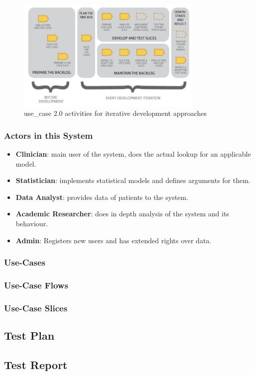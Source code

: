 {\begin{figure}[!ht]
\centering
\includegraphics[width=0.8\textwidth]{figures/uc20_flow}
\caption{\gls{use_case} 2.0 activities for iterative development approaches}
\label{fig:usecase20:flow}
\end{figure}


\subsubsection{Actors in this System}
\label{sub:sassoon:actors}
\begin{itemize}
	\item \textbf{Clinician}: main user of the system, does the actual lookup for an applicable model.
	\item \textbf{Statistician}: implements statistical models and defines arguments for them.
	\item \textbf{Data Analyst}: provides data of patients to the system.
	\item \textbf{Academic Researcher}: does in depth analysis of the system and its behaviour.
	\item \textbf{Admin}: Registers new users and has extended rights over data.
\end{itemize}
}

\subsubsection{Use-Cases}

\subsubsection{Use-Case Flows}

\subsubsection{Use-Case Slices}

\subsection{Test Plan}

\subsection{Test Report}


